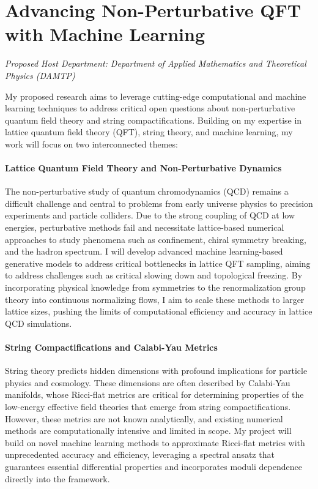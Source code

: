 \documentclass[11pt]{article}
\title{}
\author{}
\date{}
\begin{document}
\thispagestyle{firstpagestyle}

\section*{Advancing Non-Perturbative QFT with Machine Learning}
\textit{Proposed Host Department: Department of Applied Mathematics and Theoretical Physics (DAMTP)}

My proposed research aims to leverage cutting-edge computational and machine learning techniques to address critical open questions about non-perturbative quantum field theory and string compactifications.
Building on my expertise in lattice quantum field theory (QFT), string theory, and machine learning, my work will focus on two interconnected themes:

\paragraph{Lattice Quantum Field Theory and Non-Perturbative Dynamics}
The non-perturbative study of quantum chromodynamics (QCD) remains a difficult challenge and central to problems from early universe physics to precision experiments and particle colliders.
Due to the strong coupling of QCD at low energies, perturbative methods fail and necessitate lattice-based numerical approaches to study phenomena such as confinement, chiral symmetry breaking, and the hadron spectrum.
I will develop advanced machine learning-based generative models to address critical bottlenecks in lattice QFT sampling, aiming to address challenges such as critical slowing down and topological freezing. By incorporating physical knowledge from symmetries to the renormalization group theory into continuous normalizing flows, I aim to scale these methods to larger lattice sizes, pushing the limits of computational efficiency and accuracy in lattice QCD simulations.

\paragraph{String Compactifications and Calabi-Yau Metrics}
String theory predicts hidden dimensions with profound implications for particle physics and cosmology. These dimensions are often described by Calabi-Yau manifolds, whose Ricci-flat metrics are critical for determining properties of the low-energy effective field theories that emerge from string compactifications. However, these metrics are not known analytically, and existing numerical methods are computationally intensive and limited in scope. My project will build on novel machine learning methods to approximate Ricci-flat metrics with unprecedented accuracy and efficiency, leveraging a spectral ansatz that guarantees essential differential properties and incorporates moduli dependence directly into the framework.
\end{document}
